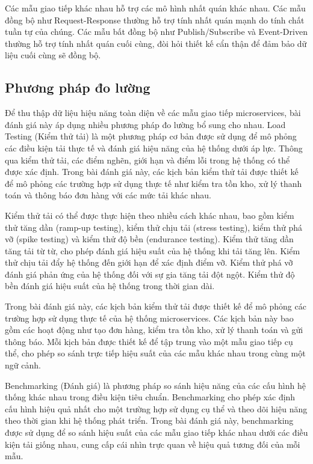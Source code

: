 Các mẫu giao tiếp khác nhau hỗ trợ các mô hình nhất quán khác nhau. Các mẫu đồng bộ như Request-Response thường hỗ trợ tính nhất quán mạnh do tính chất tuần tự của chúng. Các mẫu bất đồng bộ như Publish/Subscribe và Event-Driven thường hỗ trợ tính nhất quán cuối cùng, đòi hỏi thiết kế cẩn thận để đảm bảo dữ liệu cuối cùng sẽ đồng bộ.

\subsection{Phương pháp đo lường}
Để thu thập dữ liệu hiệu năng toàn diện về các mẫu giao tiếp microservices, bài đánh giá này áp dụng nhiều phương pháp đo lường bổ sung cho nhau. Load Testing (Kiểm thử tải) là một phương pháp cơ bản được sử dụng để mô phỏng các điều kiện tải thực tế và đánh giá hiệu năng của hệ thống dưới áp lực. Thông qua kiểm thử tải, các điểm nghẽn, giới hạn và điểm lỗi trong hệ thống có thể được xác định. Trong bài đánh giá này, các kịch bản kiểm thử tải được thiết kế để mô phỏng các trường hợp sử dụng thực tế như kiểm tra tồn kho, xử lý thanh toán và thông báo đơn hàng với các mức tải khác nhau.

Kiểm thử tải có thể được thực hiện theo nhiều cách khác nhau, bao gồm kiểm thử tăng dần (ramp-up testing), kiểm thử chịu tải (stress testing), kiểm thử phá vỡ (spike testing) và kiểm thử độ bền (endurance testing). Kiểm thử tăng dần tăng tải từ từ, cho phép đánh giá hiệu suất của hệ thống khi tải tăng lên. Kiểm thử chịu tải đẩy hệ thống đến giới hạn để xác định điểm vỡ. Kiểm thử phá vỡ đánh giá phản ứng của hệ thống đối với sự gia tăng tải đột ngột. Kiểm thử độ bền đánh giá hiệu suất của hệ thống trong thời gian dài.

Trong bài đánh giá này, các kịch bản kiểm thử tải được thiết kế để mô phỏng các trường hợp sử dụng thực tế của hệ thống microservices. Các kịch bản này bao gồm các hoạt động như tạo đơn hàng, kiểm tra tồn kho, xử lý thanh toán và gửi thông báo. Mỗi kịch bản được thiết kế để tập trung vào một mẫu giao tiếp cụ thể, cho phép so sánh trực tiếp hiệu suất của các mẫu khác nhau trong cùng một ngữ cảnh.

Benchmarking (Đánh giá) là phương pháp so sánh hiệu năng của các cấu hình hệ thống khác nhau trong điều kiện tiêu chuẩn. Benchmarking cho phép xác định cấu hình hiệu quả nhất cho một trường hợp sử dụng cụ thể và theo dõi hiệu năng theo thời gian khi hệ thống phát triển. Trong bài đánh giá này, benchmarking được sử dụng để so sánh hiệu suất của các mẫu giao tiếp khác nhau dưới các điều kiện tải giống nhau, cung cấp cái nhìn trực quan về hiệu quả tương đối của mỗi mẫu.

